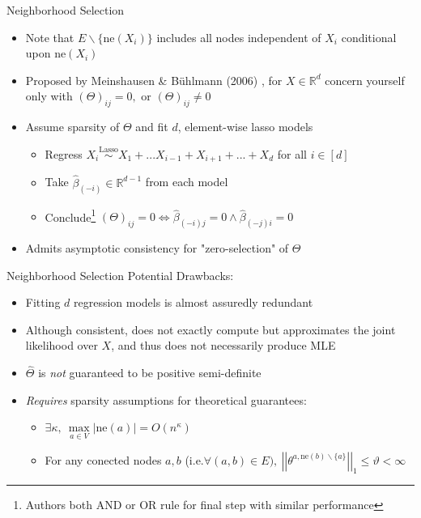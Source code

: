 \documentclass{beamer}
\newcommand{\nhood}{\text{ne}}
\begin{document}
\begin{frame}{Neighborhood Selection}
    \begin{itemize}\setlength\itemsep{6mm}
        \item Note that $E \backslash \{\nhood(X_i)\}$ includes all nodes independent of $X_i$ conditional upon $\nhood(X_i)$
        \item Proposed by Meinshausen \& B\"uhlmann (2006) \cite{meinshausen_high-dimensional_2006}, for $X\in\mathbb{R}^d$ concern yourself only with $(\Theta)_{ij} =0,$ or $(\Theta)_{ij}\neq 0$
        \item Assume sparsity of $\Theta$ and fit $d$, element-wise lasso models 
        \begin{itemize}
            \item Regress $X_i \stackrel{\text{Lasso}}{\sim} X_1 + ... X_{i-1} + X_{i+1} + ... + X_d$ for all $i\in [d]$
            \item Take $\hat\beta_{(-i)} \in \mathbb{R}^{d-1}$ from each model
            \item Conclude\footnote{Authors both AND or OR rule for final step with similar performance} $(\Theta)_{ij} = 0 \Leftrightarrow \hat\beta_{(-i)j} = 0 \land \hat\beta_{(-j)i}=0$
        \end{itemize}
        \item Admits asymptotic consistency for "zero-selection" of $\Theta$
    \end{itemize}
\end{frame}

\begin{frame}{Neighborhood Selection}
    Potential Drawbacks:
    \begin{itemize}\setlength\itemsep{4mm}
        \item Fitting $d$ regression models is almost assuredly redundant
        \item Although consistent, does not exactly compute but approximates the joint likelihood over $X$, and thus does not necessarily produce MLE \cite{banerjee_model_2008}
        \item $\hat\Theta$ is {\it not} guaranteed to be positive semi-definite
        \item {\it Requires} sparsity assumptions for theoretical guarantees:
        \begin{itemize}
            \item $\exists \kappa, \ \max\limits_{a \in V} |\nhood(a)| = O\left(n^\kappa\right)$
            \item For any conected nodes $a,b$ (i.e.$\forall (a,b) \in E), \ \left|\left| \theta^{a, \nhood(b)\backslash\{a\}} \right|\right|_1 \leq \vartheta <  \infty$ 
        \end{itemize}
    \end{itemize}
\end{frame}
\end{document}
